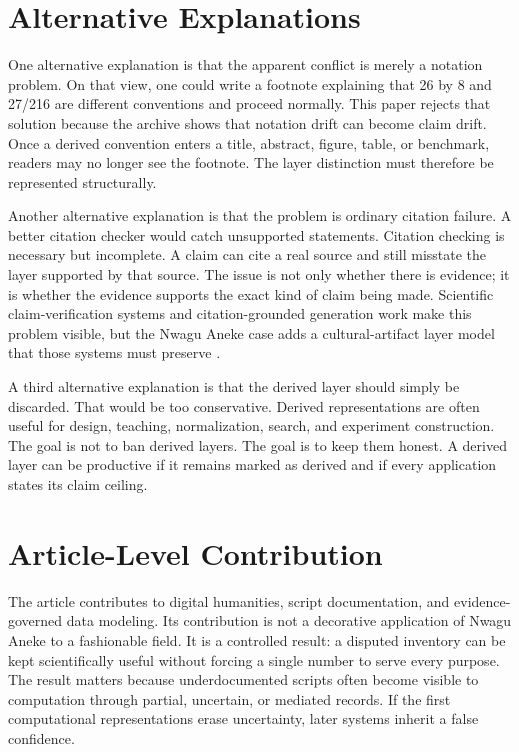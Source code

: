\documentclass[sigconf,nonacm]{acmart}
\begin{document}
\section{Alternative Explanations}
One alternative explanation is that the apparent conflict is merely a notation
problem. On that view, one could write a footnote explaining that 26 by 8 and
27/216 are different conventions and proceed normally. This paper rejects that
solution because the archive shows that notation drift can become claim drift.
Once a derived convention enters a title, abstract, figure, table, or benchmark,
readers may no longer see the footnote. The layer distinction must therefore be
represented structurally.

Another alternative explanation is that the problem is ordinary citation
failure. A better citation checker would catch unsupported statements. Citation
checking is necessary but incomplete. A claim can cite a real source and still
misstate the layer supported by that source. The issue is not only whether there
is evidence; it is whether the evidence supports the exact kind of claim being
made. Scientific claim-verification systems and citation-grounded generation
work make this problem visible, but the Nwagu Aneke case adds a cultural-artifact
layer model that those systems must preserve \cite{wadden2020scifact,gao2023alce}.

A third alternative explanation is that the derived layer should simply be
discarded. That would be too conservative. Derived representations are often
useful for design, teaching, normalization, search, and experiment construction.
The goal is not to ban derived layers. The goal is to keep them honest. A
derived layer can be productive if it remains marked as derived and if every
application states its claim ceiling.

\section{Article-Level Contribution}
The article contributes to digital humanities, script documentation, and evidence-governed data modeling. Its contribution is not a decorative
application of Nwagu Aneke to a fashionable field. It is a controlled result:
a disputed inventory can be kept scientifically useful without forcing a single number to serve every purpose. The result matters because underdocumented scripts often become
visible to computation through partial, uncertain, or mediated records. If the
first computational representations erase uncertainty, later systems inherit a
false confidence.
\end{document}
